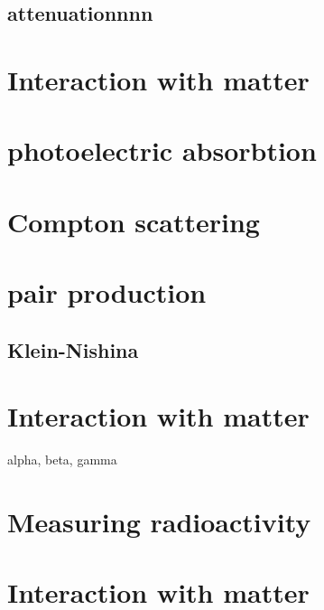 
\subsection{attenuationnnn}

\section{Interaction with matter}
\section{photoelectric absorbtion}
\section{Compton scattering}

\section{pair production}
\subsection{Klein-Nishina}
\section{Interaction with matter}
alpha, beta, gamma

\section{Measuring radioactivity}


\section{Interaction with matter}

